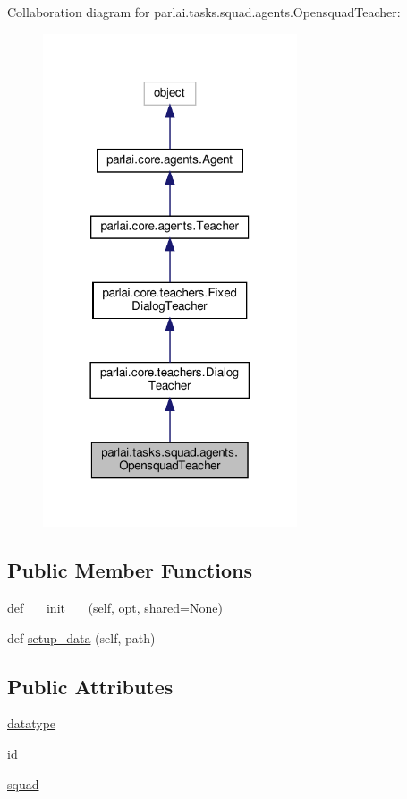 Collaboration diagram for parlai.\+tasks.\+squad.\+agents.\+Opensquad\+Teacher\+:
\nopagebreak
\begin{figure}[H]
\begin{center}
\leavevmode
\includegraphics[width=213pt]{classparlai_1_1tasks_1_1squad_1_1agents_1_1OpensquadTeacher__coll__graph}
\end{center}
\end{figure}
\subsection*{Public Member Functions}
\begin{DoxyCompactItemize}
\item 
def \hyperlink{classparlai_1_1tasks_1_1squad_1_1agents_1_1OpensquadTeacher_a1b05b43517db8f76098f6901d2b7516b}{\+\_\+\+\_\+init\+\_\+\+\_\+} (self, \hyperlink{classparlai_1_1core_1_1agents_1_1Teacher_a3ce6243860ce978a897922863ed32fa4}{opt}, shared=None)
\item 
def \hyperlink{classparlai_1_1tasks_1_1squad_1_1agents_1_1OpensquadTeacher_a3cec5f85dee7d30e1a80a4ce8c775a07}{setup\+\_\+data} (self, path)
\end{DoxyCompactItemize}
\subsection*{Public Attributes}
\begin{DoxyCompactItemize}
\item 
\hyperlink{classparlai_1_1tasks_1_1squad_1_1agents_1_1OpensquadTeacher_afcbd95d073286e65923c88490ed03e35}{datatype}
\item 
\hyperlink{classparlai_1_1tasks_1_1squad_1_1agents_1_1OpensquadTeacher_a623ab6df284c53f1266c9a24e95c981b}{id}
\item 
\hyperlink{classparlai_1_1tasks_1_1squad_1_1agents_1_1OpensquadTeacher_af69eaf825785fc1f53f34aa45e5b6c3f}{squad}
\end{DoxyCompactItemize}
